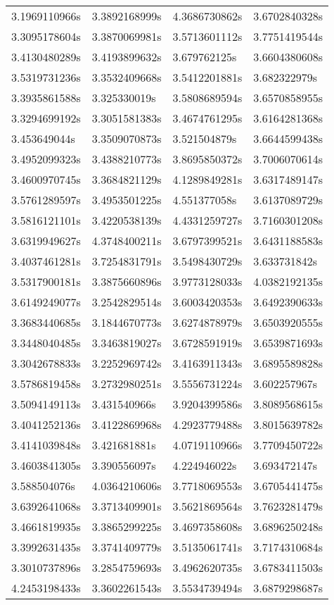 \begin{table}[]
\begin{tabular}{llll}
    3.1969110966s & 3.3892168999s & 4.3686730862s & 3.6702840328s \\
    3.3095178604s & 3.3870069981s & 3.5713601112s & 3.7751419544s \\
    3.4130480289s & 3.4193899632s & 3.679762125s  & 3.6604380608s \\
    3.5319731236s & 3.3532409668s & 3.5412201881s & 3.682322979s  \\
    3.3935861588s & 3.325330019s  & 3.5808689594s & 3.6570858955s \\
    3.3294699192s & 3.3051581383s & 3.4674761295s & 3.6164281368s \\
    3.453649044s  & 3.3509070873s & 3.521504879s  & 3.6644599438s \\
    3.4952099323s & 3.4388210773s & 3.8695850372s & 3.7006070614s \\
    3.4600970745s & 3.3684821129s & 4.1289849281s & 3.6317489147s \\
    3.5761289597s & 3.4953501225s & 4.551377058s  & 3.6137089729s \\
    3.5816121101s & 3.4220538139s & 4.4331259727s & 3.7160301208s \\
    3.6319949627s & 4.3748400211s & 3.6797399521s & 3.6431188583s \\
    3.4037461281s & 3.7254831791s & 3.5498430729s & 3.633731842s  \\
    3.5317900181s & 3.3875660896s & 3.9773128033s & 4.0382192135s \\
    3.6149249077s & 3.2542829514s & 3.6003420353s & 3.6492390633s \\
    3.3683440685s & 3.1844670773s & 3.6274878979s & 3.6503920555s \\
    3.3448040485s & 3.3463819027s & 3.6728591919s & 3.6539871693s \\
    3.3042678833s & 3.2252969742s & 3.4163911343s & 3.6895589828s \\
    3.5786819458s & 3.2732980251s & 3.5556731224s & 3.602257967s  \\
    3.5094149113s & 3.431540966s  & 3.9204399586s & 3.8089568615s \\
    3.4041252136s & 3.4122869968s & 4.2923779488s & 3.8015639782s \\
    3.4141039848s & 3.421681881s  & 4.0719110966s & 3.7709450722s \\
    3.4603841305s & 3.390556097s  & 4.224946022s  & 3.693472147s  \\
    3.588504076s  & 4.0364210606s & 3.7718069553s & 3.6705441475s \\
    3.6392641068s & 3.3713409901s & 3.5621869564s & 3.7623281479s \\
    3.4661819935s & 3.3865299225s & 3.4697358608s & 3.6896250248s \\
    3.3992631435s & 3.3741409779s & 3.5135061741s & 3.7174310684s \\
    3.3010737896s & 3.2854759693s & 3.4962620735s & 3.6783411503s \\
    4.2453198433s & 3.3602261543s & 3.5534739494s & 3.6879298687s
  \end{tabular}
\end{table}

